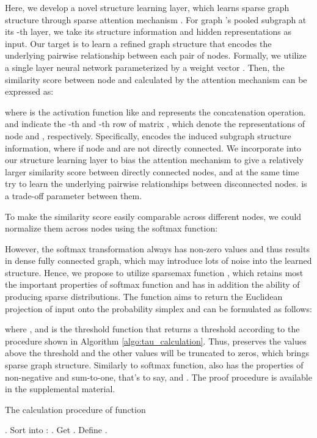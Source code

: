 \documentclass[letterpaper]{article} \usepackage{aaai20}  \usepackage{times}  \usepackage{helvet} \usepackage{courier}  \usepackage[hyphens]{url}  \usepackage{graphicx} \urlstyle{rm} \def\UrlFont{\rm}  \usepackage{graphicx}  \frenchspacing  \setlength{\pdfpagewidth}{8.5in}  \setlength{\pdfpageheight}{11in}
\begin{document}
Here, we develop a novel structure learning layer, which learns sparse graph structure through sparse attention mechanism \cite{martins2016softmax}. For graph 's pooled subgraph  at its -th layer, we take its structure information  and hidden representations  as input. Our target is to learn a refined graph structure that encodes the underlying pairwise relationship between each pair of nodes. Formally, we utilize a single layer neural network parameterized by a weight vector . Then, the similarity score between node  and  calculated by the attention mechanism can be expressed as:

where  is the activation function like  and  represents the concatenation operation.  and  indicate the -th and -th row of matrix , which denote the representations of node  and , respectively. Specifically,  encodes the induced subgraph structure information, where  if node  and  are not directly connected. We incorporate  into our structure learning layer to bias the attention mechanism to give a relatively larger similarity score between directly connected nodes, and at the same time try to learn the underlying pairwise relationships between disconnected nodes.  is a trade-off parameter between them.

To make the similarity score easily comparable across different nodes, we could normalize them across nodes using the softmax function:

However, the softmax transformation always has non-zero values and thus results in dense fully connected graph, which may introduce lots of noise into the learned structure. Hence, we propose to utilize sparsemax function \cite{martins2016softmax}, which retains most the important properties of softmax function and has in addition the ability of producing sparse distributions. The  function aims to return the Euclidean projection of input onto the probability simplex and can be formulated as follows:

where , and  is the threshold function that returns a threshold according to the procedure shown in Algorithm \ref{algo:tau_calculation}. Thus,  preserves the values above the threshold and the other values will be truncated to zeros, which brings sparse graph structure. Similarly to softmax function,  also has the properties of non-negative and sum-to-one, that's to say,  and . The proof procedure is available in the supplemental material.
\begin{algorithm}
  \caption{The calculation procedure of function }
  \label{algo:tau_calculation}
  \begin{algorithmic}[1]
    .
    \State Sort  into : .
    \State Get .
    \State Define .
  \end{algorithmic}
\end{algorithm}
\end{document}

